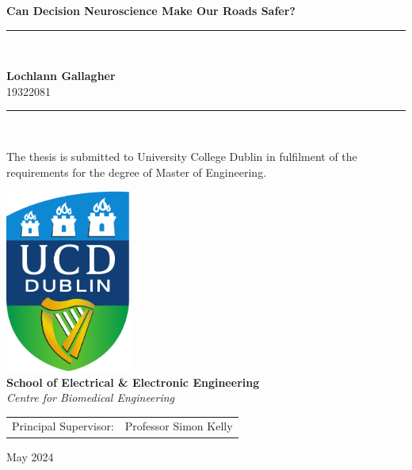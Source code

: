 \begin{titlepage}%
\begin{center}

\def\title{Can Decision Neuroscience Make Our Roads Safer?}
\def\studentNm{Lochlann Gallagher}
\def\studentNo{19322081}
\def\supervisor{Professor Simon Kelly}
\def\schHead{Associate Professor Paul Curran} %
\def\school{School of Electrical \& Electronic Engineering}
\def\centre{Centre for Biomedical Engineering}

\Huge
\textbf{\title}\\
\rule{4cm}{1pt}\\

\vfill

\Large \textbf{\studentNm}\\
\small \studentNo
\vfill
\rule{4cm}{1pt}\\

\vfill

\Large
The thesis is submitted to University College Dublin in fulfilment of the requirements for the
degree of Master of Engineering.

\vfill

\includegraphics[height=6cm]{figures/UCD_Logo}\\[1cm]

\vfill
\textbf{\school}\\
\emph{\centre}

\vfill

\normalsize

\begin{tabular}{rl}
    Principal Supervisor:   & \supervisor   \\
\end{tabular}

\vfill

\Large
May 2024

\end{center}
\end{titlepage}